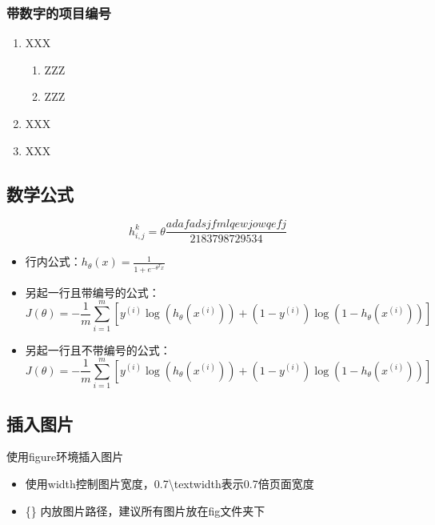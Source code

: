 \documentclass[hyperref,a4paper,UTF8]{ctexart}
\begin{document}
\subsubsection{带数字的项目编号}
\begin{enumerate}
    \item XXX \begin{enumerate}
        \item ZZZ
        \item ZZZ
    \end{enumerate}
    \item XXX
    \item XXX
\end{enumerate}

\subsection{数学公式}

\begin{equation*}
    h_{i,j}^k = \theta \frac{adafadsjfmlqewjowqefj}{2183798729534}
\end{equation*}

\begin{itemize}
    \item 行内公式：$h_\theta(x) = \frac{1}{1 + e^{-\theta^Tx}}$
    \item 另起一行且带编号的公式：
        \begin{equation}
        J(\theta) = -\frac{1}{m}\sum_{i=1}^{m}[y^{(i)}\log(h_\theta(x^{(i)})) + (1-y^{(i)})\log(1-h_\theta(x^{(i)}))]
        \end{equation}

    \item 另起一行且不带编号的公式：
        \begin{equation*}
        J(\theta) = -\frac{1}{m}\sum_{i=1}^{m}[y^{(i)}\log(h_\theta(x^{(i)})) + (1-y^{(i)})\log(1-h_\theta(x^{(i)}))]
        \end{equation*}
\end{itemize}








\subsection{插入图片}
使用figure环境插入图片
\begin{itemize}
    \item 使用width控制图片宽度，0.7\textbackslash textwidth表示0.7倍页面宽度
    \item \{\} 内放图片路径，建议所有图片放在fig文件夹下
\end{itemize}
\end{document}
